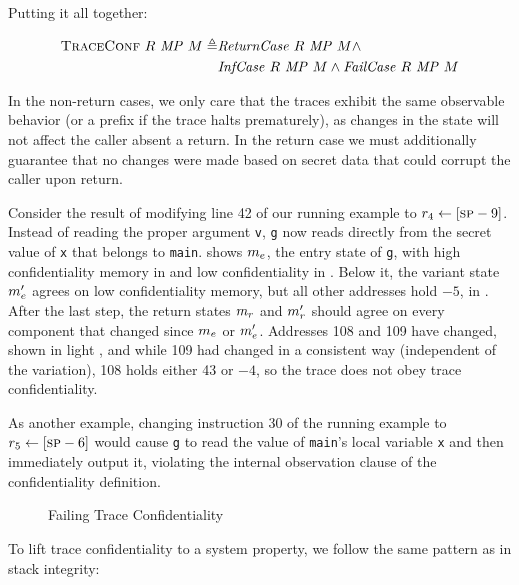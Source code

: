\documentclass[acmsmall,review,anonymous]{acmart}\settopmatter{printfolios=true,printccs=false,printacmref=false}
\begin{document}
{Putting it all together:

\[\begin{split}
  \text{\sc TraceConf} ~ R ~ \mathit{MP} ~ M \triangleq
  & \mathit{ReturnCase} ~ R ~ \mathit{MP} ~ M \land \\
  & \mathit{InfCase} ~ R ~ \mathit{MP} ~ M \land
    \mathit{FailCase} ~ R ~ \mathit{MP} ~ M \\
\end{split}\]

In the non-return cases, we only care that the traces exhibit the same
observable behavior (or a prefix if the trace halts prematurely), as changes
in the state will not affect the caller absent a return.  In the return case
we must additionally guarantee that no changes were made based on secret data
that could corrupt the caller upon return.

Consider the result of modifying line 42 of our running example to $r_4 \leftarrow [\textsc{sp} - 9]$.
Instead of reading the proper argument {\tt v}, {\tt g} now reads directly from the
secret value of {\tt x} that belongs to {\tt main}. 
shows \(m_e\), the entry state of {\tt g}, with high confidentiality memory
in {\high} and low confidentiality in {\low}. Below it, the variant state
\(m_e'\) agrees on low confidentiality memory, but all other addresses
hold $-5$, in {\varied}.  After the last step, the return states \(m_r\) and
\(m_r'\) should agree on every component that changed since \(m_e\) or
\(m_e'\). Addresses 108 and 109 have changed, shown in light {\low}, and while 109
had changed in a consistent way (independent of the variation), 108 holds either 43 or $-4$, so the trace does not obey trace confidentiality.

As another example, changing instruction 30 of the running example to
$r_5 \leftarrow [\textsc{sp} - 6]$ would cause {\tt g} to read the value of
{\tt main}'s local variable {\tt x} and then immediately output it,
violating the internal observation clause of the confidentiality
definition.

\begin{figure}
  \confidentialityendexample
  \caption{Failing Trace Confidentiality}
  \label{fig:confex}
\end{figure}

To lift trace confidentiality to a system property, we follow the same
pattern as in stack integrity:

}
\end{document}
